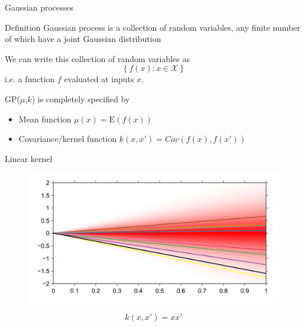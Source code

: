 \documentclass[12pt]{beamer}
\begin{document}
\begin{frame}{Gaussian processes}
    \begin{block}{Definition}
    Gaussian process is a collection of random variables, any finite number of which have a joint Gaussian distribution 
    \end{block}\pause
    We can write this collection of random variables as
    $$
    \left\{f(x)\colon x\in \mathcal{X} \right\}
    $$
    i.e. a function $f$ evaluated at inputs $x$.
    \pause
    \begin{block}{GP($\mu$,$k$) is completely specified by}\pause
    \begin{itemize}
        \item Mean function $\mu(x)=\mathrm{E}(f(x))$\pause
        \item Covariance/kernel function $k(x,x') = Cov(f(x),f(x'))$
    \end{itemize}
    \end{block}
\end{frame}


\begin{frame}{Linear kernel}
\begin{figure}
\includegraphics[scale=0.4]{Bayesian_non_linear_1.png} 
\end{figure}
$$
k(x,x')=x x'
$$
\end{frame}
\end{document}
